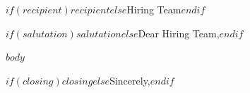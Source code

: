 \documentclass[$if(fontsize)$$fontsize$$else$11pt$endif$]{letter}
\begin{document}
\begin{letter}{$if(recipient)$$recipient$$else$Hiring Team$endif$}

\opening{$if(salutation)$$salutation$$else$Dear Hiring Team,$endif$}

$body$

\closing{$if(closing)$$closing$$else$Sincerely,$endif$}

\end{letter}
\end{document}
